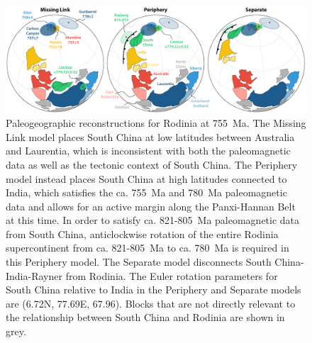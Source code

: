\begin{figure}[h!]
    \centering
    \includegraphics[width=\textwidth]{figures/Xiajiang/Rodinia-models.pdf}
    \caption[Paleogeographic reconstructions for Rodinia at 755~Ma.]{Paleogeographic reconstructions for Rodinia at 755~Ma. The Missing Link model places South China at low latitudes between Australia and Laurentia, which is inconsistent with both the paleomagnetic data as well as the tectonic context of South China. The Periphery model instead places South China at high latitudes connected to India, which satisfies the ca. 755~Ma and 780~Ma paleomagnetic data and allows for an active margin along the Panxi-Hannan Belt at this time. In order to satisfy ca. 821-805~Ma paleomagnetic data from South China, anticlockwise rotation of the entire Rodinia supercontinent from ca. 821-805~Ma to ca. 780~Ma is required in this Periphery model. The Separate model disconnects South China-India-Rayner from Rodinia. The Euler rotation parameters for South China relative to India in the Periphery and Separate models are (6.72\degrees N, 77.69\degrees E, 67.96\degrees). Blocks that are not directly relevant to the relationship between South China and Rodinia are shown in grey.}
    \label{fig:Rodinia-models}
\end{figure}

